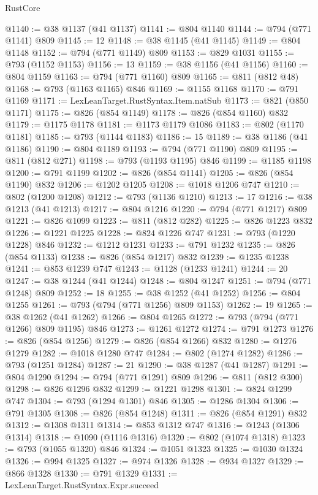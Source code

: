 \begin{lexlean}{RustCore}
\begin{coremodule}
@1140 := @38 @1137 (@41 @1137)
@1141 := @804 @1140
@1144 := @794 (@771 @1141) @809
@1145 := 12
@1148 := @38 @1145 (@41 @1145)
@1149 := @804 @1148
@1152 := @794 (@771 @1149) @809
@1153 := @829 @1031
@1155 := @793 (@1152 @1153)
@1156 := 13
@1159 := @38 @1156 (@41 @1156)
@1160 := @804 @1159
@1163 := @794 (@771 @1160) @809
@1165 := @811 (@812 @48)
@1168 := @793 (@1163 @1165) @846
@1169 := @1155 @1168
@1170 := @791 @1169
@1171 := LexLeanTarget.RustSyntax.Item.natSub
@1173 := @821 (@850 @1171)
@1175 := @826 (@854 @1149)
@1178 := @826 (@854 @1160) @832
@1179 := @1175 @1178
@1181 := @1173 @1179 @1086
@1183 := @802 (@1170 @1181)
@1185 := @793 (@1144 @1183)
@1186 := 15
@1189 := @38 @1186 (@41 @1186)
@1190 := @804 @1189
@1193 := @794 (@771 @1190) @809
@1195 := @811 (@812 @271)
@1198 := @793 (@1193 @1195) @846
@1199 := @1185 @1198
@1200 := @791 @1199
@1202 := @826 (@854 @1141)
@1205 := @826 (@854 @1190) @832
@1206 := @1202 @1205
@1208 := @1018 @1206 @747
@1210 := @802 (@1200 @1208)
@1212 := @793 (@1136 @1210)
@1213 := 17
@1216 := @38 @1213 (@41 @1213)
@1217 := @804 @1216
@1220 := @794 (@771 @1217) @809
@1221 := @826 @1099
@1223 := @811 (@812 @282)
@1225 := @826 @1223 @832
@1226 := @1221 @1225
@1228 := @824 @1226 @747
@1231 := @793 (@1220 @1228) @846
@1232 := @1212 @1231
@1233 := @791 @1232
@1235 := @826 (@854 @1133)
@1238 := @826 (@854 @1217) @832
@1239 := @1235 @1238
@1241 := @853 @1239 @747
@1243 := @1128 (@1233 @1241)
@1244 := 20
@1247 := @38 @1244 (@41 @1244)
@1248 := @804 @1247
@1251 := @794 (@771 @1248) @809
@1252 := 18
@1255 := @38 @1252 (@41 @1252)
@1256 := @804 @1255
@1261 := @793 (@794 (@771 @1256) @809 @1153)
@1262 := 19
@1265 := @38 @1262 (@41 @1262)
@1266 := @804 @1265
@1272 := @793 (@794 (@771 @1266) @809 @1195) @846
@1273 := @1261 @1272
@1274 := @791 @1273
@1276 := @826 (@854 @1256)
@1279 := @826 (@854 @1266) @832
@1280 := @1276 @1279
@1282 := @1018 @1280 @747
@1284 := @802 (@1274 @1282)
@1286 := @793 (@1251 @1284)
@1287 := 21
@1290 := @38 @1287 (@41 @1287)
@1291 := @804 @1290
@1294 := @794 (@771 @1291) @809
@1296 := @811 (@812 @300)
@1298 := @826 @1296 @832
@1299 := @1221 @1298
@1301 := @824 @1299 @747
@1304 := @793 (@1294 @1301) @846
@1305 := @1286 @1304
@1306 := @791 @1305
@1308 := @826 (@854 @1248)
@1311 := @826 (@854 @1291) @832
@1312 := @1308 @1311
@1314 := @853 @1312 @747
@1316 := @1243 (@1306 @1314)
@1318 := @1090 (@1116 @1316)
@1320 := @802 (@1074 @1318)
@1323 := @793 (@1055 @1320) @846
@1324 := @1051 @1323
@1325 := @1030 @1324
@1326 := @994 @1325
@1327 := @974 @1326
@1328 := @934 @1327
@1329 := @866 @1328
@1330 := @791 @1329
@1331 := LexLeanTarget.RustSyntax.Expr.succeed

\end{coremodule}
\end{lexlean}
